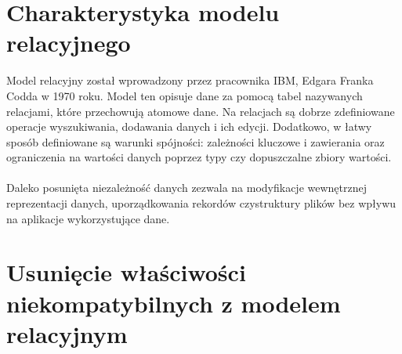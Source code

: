 \documentclass{mwrep}[15pt]
\begin{document}
\section{Charakterystyka modelu relacyjnego}
Model relacyjny został wprowadzony przez pracownika IBM, Edgara Franka Codda w 1970 roku\cite{Codd}. Model 
ten opisuje dane za pomocą tabel nazywanych relacjami, które przechowują atomowe dane. Na relacjach są dobrze
zdefiniowane operacje wyszukiwania, dodawania danych i ich edycji. Dodatkowo, w łatwy sposób 
definiowane są warunki spójności: zależności kluczowe i zawierania oraz ograniczenia na wartości danych poprzez
typy czy dopuszczalne zbiory wartości.\\
\\
\indent Daleko posunięta niezależność danych zezwala na modyfikacje wewnętrznej reprezentacji
danych, uporządkowania rekordów czystruktury plików bez wpływu na aplikacje
wykorzystujące dane.

\section{Usunięcie właściwości niekompatybilnych z modelem relacyjnym}
\end{document}
